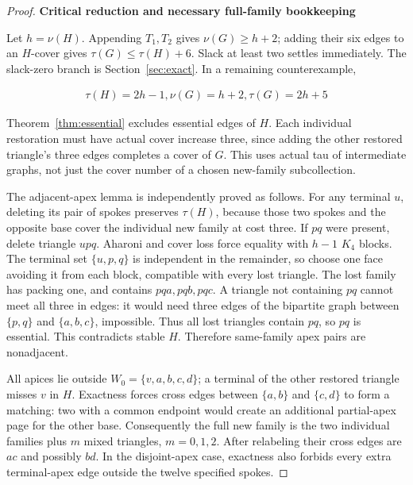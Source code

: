 \documentclass[11pt]{article}
\theoremstyle{definition}\newtheorem{definition}[theorem]{Definition}
\theoremstyle{remark}\newtheorem{remark}[theorem]{Remark}
\begin{document}
\begin{proof}\leavevmode
\par\medskip\noindent\textbf{Critical reduction and necessary full-family bookkeeping}\label{critical-reduction-and-necessary-full-family-bookkeeping}

Let \(h=\nu(H)\). Appending \(T_1,T_2\) gives \(\nu(G)\ge h+2\); adding their six edges to an \(H\)-cover gives \(\tau(G)\le \tau(H)+6\). Slack at least two settles immediately. The slack-zero branch is Section~\ref{sec:exact}. In a remaining counterexample,

\begin{equation}
\begin{gathered}
\tau(H)=2h-1, \nu(G)=h+2, \tau(G)=2h+5
\end{gathered}
\end{equation}

Theorem~\ref{thm:essential} excludes essential edges of \(H\). Each individual restoration must have actual cover increase three, since adding the other restored triangle's three edges completes a cover of \(G\). This uses actual tau of intermediate graphs, not just the cover number of a chosen new-family subcollection.

The adjacent-apex lemma is independently proved as follows. For any terminal \(u\), deleting its pair of spokes preserves \(\tau(H)\), because those two spokes and the opposite base cover the individual new family at cost three. If \(pq\) were present, delete triangle \(upq\). Aharoni and cover loss force equality with \(h-1\) \(K_4\) blocks. The terminal set \(\{u,p,q\}\) is independent in the remainder, so choose one face avoiding it from each block, compatible with every lost triangle. The lost family has packing one, and contains \(pqa,pqb,pqc\). A triangle not containing \(pq\) cannot meet all three in edges: it would need three edges of the bipartite graph between \(\{p,q\}\) and \(\{a,b,c\}\), impossible. Thus all lost triangles contain \(pq\), so \(pq\) is essential. This contradicts stable \(H\). Therefore same-family apex pairs are nonadjacent.

All apices lie outside \(W_0=\{v,a,b,c,d\}\); a terminal of the other restored triangle misses \(v\) in \(H\). Exactness forces cross edges between \(\{a,b\}\) and \(\{c,d\}\) to form a matching: two with a common endpoint would create an additional partial-apex page for the other base. Consequently the full new family is the two individual families plus \(m\) mixed triangles, \(m=0,1,2\). After relabeling their cross edges are \(ac\) and possibly \(bd\). In the disjoint-apex case, exactness also forbids every extra terminal-apex edge outside the twelve specified spokes.


\end{proof}
\end{document}
